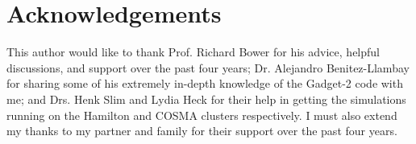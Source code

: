 \vspace{3cm}

\section*{Acknowledgements}

This author would like to thank Prof. Richard Bower for his advice, helpful discussions, and support over the past four years; Dr. Alejandro Benitez-Llambay for sharing some of his extremely in-depth knowledge of the Gadget-2 code with me; and Drs. Henk Slim and Lydia Heck for their help in getting the simulations running on the Hamilton and COSMA clusters respectively. I must also extend my thanks to my partner and family for their support over the past four years.
